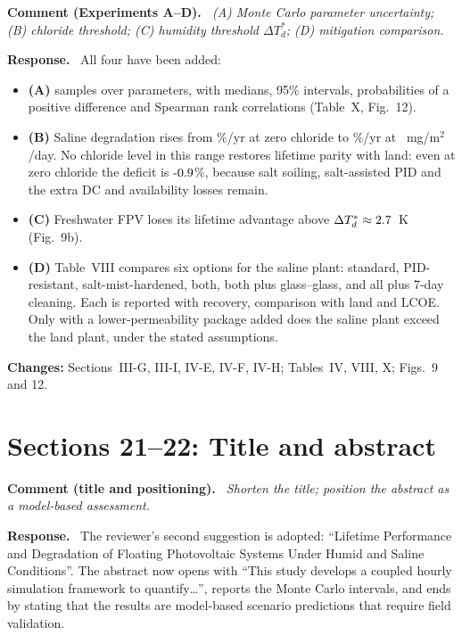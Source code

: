 \documentclass[11pt]{article}
\newcounter{cmt}
\newenvironment{comment}[1]{\refstepcounter{cmt}\par\medskip\noindent\textbf{Comment \thecmt{} (#1).}\itshape\ }{\par}
\newenvironment{response}{\par\noindent\textbf{Response.}\ }{\par}
\newcommand{\change}[1]{\par\noindent\textcolor{blue!50!black}{\textbf{Changes:} #1}\par}
\begin{document}
\begin{comment}{Experiments A--D}
(A) Monte Carlo parameter uncertainty; (B) chloride threshold; (C) humidity threshold $\Delta T_d^*$; (D) mitigation
comparison.
\end{comment}
\begin{response}
All four have been added:
\begin{itemize}[nosep]
\item \textbf{(A)} \NMC{} samples over \NParams{} parameters, with medians, 95\% intervals, probabilities of a positive
difference and Spearman rank correlations (Table~X, Fig.~12).
\item \textbf{(B)} Saline degradation rises from \DegSalineClZero\%/yr at zero chloride to \DegSalineClMax\%/yr at
\ClMax~mg/m$^2$/day. No chloride level in this range restores lifetime parity with land: even at zero chloride the
deficit is $\LifeSalineClZeroPct$\%, because salt soiling, salt-assisted PID and the extra DC and availability losses
remain.
\item \textbf{(C)} Freshwater FPV loses its lifetime advantage above $\Delta T_d^*\approx2.7$~K (Fig.~9b).
\item \textbf{(D)} Table~VIII compares six options for the saline plant: standard, PID-resistant, salt-mist-hardened,
both, both plus glass--glass, and all plus 7-day cleaning. Each is reported with recovery, comparison with land and
LCOE. Only with a lower-permeability package added does the saline plant exceed the land plant, under the stated
assumptions.
\end{itemize}
\end{response}
\change{Sections~III-G, III-I, IV-E, IV-F, IV-H; Tables~IV, VIII, X; Figs.~9 and 12.}

\section*{Sections 21--22: Title and abstract}

\begin{comment}{title and positioning}
Shorten the title; position the abstract as a model-based assessment.
\end{comment}
\begin{response}
The reviewer's second suggestion is adopted: ``Lifetime Performance and Degradation of Floating Photovoltaic Systems
Under Humid and Saline Conditions''. The abstract now opens with ``This study develops a coupled hourly simulation
framework to quantify\ldots'', reports the Monte Carlo intervals, and ends by stating that the results are model-based
scenario predictions that require field validation.
\end{response}
\end{document}
